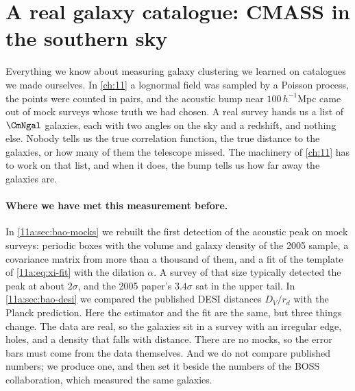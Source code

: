 \providecommand{\BaoPlateau}{}\renewcommand{\BaoPlateau}{3.0}
\providecommand{\BaoEdgeLo}{}\renewcommand{\BaoEdgeLo}{2.3}
\providecommand{\PubSigLoc}{}\renewcommand{\PubSigLoc}{0.012}
\providecommand{\BaoProd}{}\renewcommand{\BaoProd}{0.083}
\providecommand{\PubProd}{}\renewcommand{\PubProd}{0.073}
\providecommand{\BaoExpSignif}{}\renewcommand{\BaoExpSignif}{2.9}
\providecommand{\BaoExpSigAlpha}{}\renewcommand{\BaoExpSigAlpha}{0.025}
\providecommand{\DiffAlpha}{}\renewcommand{\DiffAlpha}{0.014}
\providecommand{\SigDiffAlpha}{}\renewcommand{\SigDiffAlpha}{0.050}
\providecommand{\DiffPull}{}\renewcommand{\DiffPull}{0.3}
\providecommand{\PubAlphaBest}{}\renewcommand{\PubAlphaBest}{0.978}
\providecommand{\BaoShort}{}\renewcommand{\BaoShort}{1.3}
\providecommand{\BaoShortP}{}\renewcommand{\BaoShortP}{10}
\providecommand{\BaoEdgeWeight}{}\renewcommand{\BaoEdgeWeight}{0.32}
 
\section{A real galaxy catalogue: CMASS in the southern sky}
\label{13c:sec:catalogue}

Everything we know about measuring galaxy clustering we learned on catalogues we
made ourselves. In \cref{ch:11} a lognormal field was sampled by a Poisson process,
the points were counted in pairs, and the acoustic bump near $100\,h^{-1}$Mpc came
out of mock surveys whose truth we had chosen. A real survey hands us a list of
$\CmNgal$ galaxies, each with two angles on the sky and a redshift, and nothing else.
Nobody tells us the true correlation function, the true distance to the galaxies,
or how many of them the telescope missed. The machinery of \cref{ch:11} has to work
on that list, and when it does, the bump tells us how far away the galaxies are.

\paragraph{Where we have met this measurement before.}
In \cref{11a:sec:bao-mocks} we rebuilt the first detection of the acoustic peak
\cite{Eisenstein2005} on mock surveys: periodic boxes with the volume and galaxy
density of the 2005 sample, a covariance matrix from more than a thousand of
them, and a fit of the template of \cref{11a:eq:xi-fit} with the dilation $\alpha$.
A survey of that size typically detected the peak at about $2\sigma$, and the 2005
paper's $3.4\sigma$ sat in the upper tail. In \cref{11a:sec:bao-desi} we compared
the published DESI distances $D_V/r_d$ with the Planck prediction. Here the
estimator and the fit are the same, but three things change. The data are real,
so the galaxies sit in a survey with an irregular edge, holes, and a density that
falls with distance. There are no mocks, so the error bars must come from the data
themselves. And we do not compare published numbers; we produce one, and then set
it beside the numbers of the BOSS collaboration, which measured the same galaxies.

